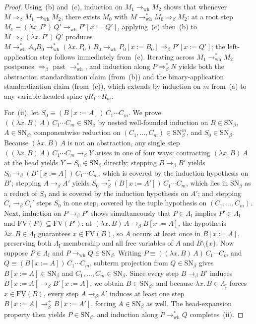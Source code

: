 \documentclass[11pt,reqno]{amsart}
\numberwithin{equation}{section}
\theoremstyle{plain}
\theoremstyle{definition}
\theoremstyle{remark}
\newcommand{\SN}{\mathrm{SN}}
\begin{document}
\begin{proof}
Using~(b) and~(c), induction on $M_1 \to_{\mathrm{wh}} M_2$ shows that whenever $M \Rightarrow_\beta M_1 \to_{\mathrm{wh}} M_2$, there exists $M_0$ with $M \to_{\mathrm{wh}}^* M_0 \Rightarrow_\beta M_2$: at a root step $M_1 \equiv (\lambda x.\, P')\,Q' \to_{\mathrm{wh}} P'[x := Q']$, applying~(c) then~(b) to $M \Rightarrow_\beta (\lambda x.\, P')\,Q'$ produces $M \to_{\mathrm{wh}}^* A_0 B_0 \to_{\mathrm{wh}}^* (\lambda x.\, P_0)\,B_0 \to_{\mathrm{wh}} P_0[x := B_0] \Rightarrow_\beta P'[x := Q']$; the left-application step follows immediately from~(c). Iterating across $M_1 \to_{\mathrm{wh}}^* M_2$ postpones $\Rightarrow_\beta$ past $\to_{\mathrm{wh}}^*$, and induction along $P \Rightarrow_\beta^* N$ yields both the abstraction standardization claim (from~(b)) and the binary-application standardization claim (from~(c)), which extends by induction on $m$ from~(a) to any variable-headed spine $y R_1 \cdots R_m$.

For~(ii), let $S_0 \equiv (B[x := A])\,C_1 \cdots C_m$. We prove $((\lambda x.\, B)\,A)\,C_1 \cdots C_m \in \SN_\beta$ by nested well-founded induction on $B \in \SN_\beta$, $A \in \SN_\beta$, componentwise reduction on $(C_1, \dots, C_m) \in \SN_\beta^m$, and $S_0 \in \SN_\beta$. Because $(\lambda x.\, B)\,A$ is not an abstraction, any single step $((\lambda x.\, B)\,A)\,C_1 \cdots C_m \to_\beta Y$ arises in one of four ways: contracting $(\lambda x.\, B)\,A$ at the head yields $Y \equiv S_0 \in \SN_\beta$ directly; stepping $B \to_\beta B'$ yields $S_0 \to_\beta (B'[x := A])\,C_1 \cdots C_m$, which is covered by the induction hypothesis on $B'$; stepping $A \to_\beta A'$ yields $S_0 \to_\beta^* (B[x := A'])\,C_1 \cdots C_m$, which lies in $\SN_\beta$ as a reduct of $S_0$ and is covered by the induction hypothesis on $A'$; and stepping $C_i \to_\beta C_i'$ steps $S_0$ in one step, covered by the tuple hypothesis on $(C_1, \dots, C_m)$. Next, induction on $P \to_\beta P'$ shows simultaneously that $P \in \Lambda_{\mathrm{I}}$ implies $P' \in \Lambda_{\mathrm{I}}$ and $\mathrm{FV}(P) \subseteq \mathrm{FV}(P')$: at $(\lambda x.\, B)\,A \to_\beta B[x := A]$, the hypothesis $\lambda x.\, B \in \Lambda_{\mathrm{I}}$ guarantees $x \in \mathrm{FV}(B)$, so $A$ occurs at least once in $B[x := A]$, preserving both $\Lambda_{\mathrm{I}}$-membership and all free variables of $A$ and $B \setminus \{x\}$. Now suppose $P \in \Lambda_{\mathrm{I}}$ and $P \to_{\mathrm{wh}} Q \in \SN_\beta$. Writing $P \equiv ((\lambda x.\, B)\,A)\,C_1 \cdots C_m$ and $Q \equiv (B[x := A])\,C_1 \cdots C_m$, subterm projection from $Q \in \SN_\beta$ gives $B[x := A] \in \SN_\beta$ and $C_1, \dots, C_m \in \SN_\beta$. Since every step $B \to_\beta B'$ induces $B[x := A] \to_\beta B'[x := A]$, we obtain $B \in \SN_\beta$; and because $\lambda x.\, B \in \Lambda_{\mathrm{I}}$ forces $x \in \mathrm{FV}(B)$, every step $A \to_\beta A'$ induces at least one step $B[x := A] \to_\beta^+ B[x := A']$, forcing $A \in \SN_\beta$ as well. The head-expansion property then yields $P \in \SN_\beta$, and induction along $P \to_{\mathrm{wh}}^* Q$ completes~(ii).


\end{proof}
\end{document}
